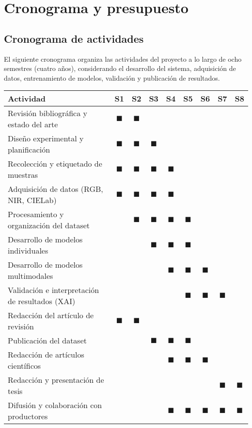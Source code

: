 
\chapter{Cronograma y presupuesto}

\label{Chapter4}


\section{Cronograma de actividades}

El siguiente cronograma organiza las actividades del proyecto a lo largo de ocho semestres (cuatro años), considerando el desarrollo del sistema, adquisición de datos, entrenamiento de modelos, validación y publicación de resultados.

\begin{center}
\begin{tabular}{|p{10cm}|c|c|c|c|c|c|c|c|}
\hline
\textbf{Actividad} & \textbf{S1} & \textbf{S2} & \textbf{S3} & \textbf{S4} & \textbf{S5} & \textbf{S6} & \textbf{S7} & \textbf{S8} \\
\hline
Revisión bibliográfica y estado del arte & $ \blacksquare$ &  $ \blacksquare$ & & & & & & \\
Diseño experimental y planificación & $\blacksquare$ & $\blacksquare$ & $\blacksquare$ & & & & & \\
Recolección y etiquetado de muestras & $\blacksquare$ & $\blacksquare$ & $\blacksquare$ & $\blacksquare$ & & & & \\
Adquisición de datos (RGB, NIR, CIELab) & $\blacksquare$ & $\blacksquare$ & $\blacksquare$ & $\blacksquare$ & & & & \\
Procesamiento y organización del dataset & & $\blacksquare$ & $\blacksquare$ & $\blacksquare$ & $\blacksquare$ & & & \\
Desarrollo de modelos individuales & & & $\blacksquare$ & $\blacksquare$ & $\blacksquare$ & & & \\
Desarrollo de modelos multimodales & & & & $\blacksquare$ & $\blacksquare$ & $\blacksquare$ & & \\
Validación e interpretación de resultados (XAI) & & & & & $\blacksquare$ & $\blacksquare$ & $\blacksquare$ & \\
Redacción del artículo de revisión & $\blacksquare$ & $\blacksquare$ & & & & & & \\
Publicación del dataset & & & $\blacksquare$ & $\blacksquare$ & $\blacksquare$ & & & \\
Redacción de artículos científicos & & & & $\blacksquare$ & $\blacksquare$ & $\blacksquare$ & & \\
Redacción y presentación de tesis & & & & & & & $\blacksquare$ & $\blacksquare$ \\
Difusión y colaboración con productores & & & & $\blacksquare$ & $\blacksquare$ & $\blacksquare$ & $\blacksquare$ & $\blacksquare$ \\
\hline
\end{tabular}
\end{center}


